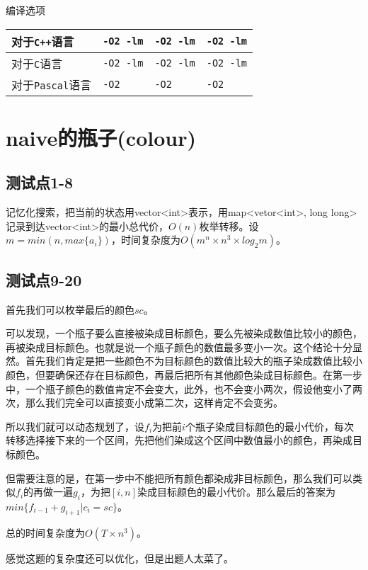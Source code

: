 \documentclass{ctexart}
\begin{document}
编译选项
\begin{table}[hb]
	\begin{center}
		\begin{tabular}{|p{3.37cm}|p{3.37cm}|p{3.37cm}|p{3.37cm}|}
			\hline
			对于\texttt{C++}语言 & \texttt{-O2 -lm} & \texttt{-O2 -lm} & \texttt{-O2 -lm} \\
			\hline
			对于\texttt{C}语言 & \texttt{-O2 -lm} & \texttt{-O2 -lm} & \texttt{-O2 -lm} \\
			\hline
			对于\texttt{Pascal}语言 & \texttt{-O2}    & \texttt{-O2}    & \texttt{-O2}     \\
			\hline
		\end{tabular}
	\end{center}
\end{table}



\newpage

\section{naive的瓶子(colour)}

\subsection{测试点1-8}

记忆化搜索，把当前的状态用vector<int>表示，用map<vetor<int>, long long>记录到达vector<int>的最小总代价，$O(n)$枚举转移。设$m = min(n, max\{a_i\})$，时间复杂度为$O(m^n \times n^3 \times log_2{m})$。 \par

\subsection{测试点9-20}

首先我们可以枚举最后的颜色$sc$。\par
可以发现，一个瓶子要么直接被染成目标颜色，要么先被染成数值比较小的颜色，再被染成目标颜色。也就是说一个瓶子颜色的数值最多变小一次。这个结论十分显然。首先我们肯定是把一些颜色不为目标颜色的数值比较大的瓶子染成数值比较小颜色，但要确保还存在目标颜色，再最后把所有其他颜色染成目标颜色。在第一步中，一个瓶子颜色的数值肯定不会变大，此外，也不会变小两次，假设他变小了两次，那么我们完全可以直接变小成第二次，这样肯定不会变劣。 \par
所以我们就可以动态规划了，设$f_i$为把前$i$个瓶子染成目标颜色的最小代价，每次转移选择接下来的一个区间，先把他们染成这个区间中数值最小的颜色，再染成目标颜色。 \par
但需要注意的是，在第一步中不能把所有颜色都染成非目标颜色，那么我们可以类似$f_i$的再做一遍$g_i$，为把$[i, n]$染成目标颜色的最小代价。那么最后的答案为$min\{f_{i - 1} + g_{i + 1} | c_i = sc\}$。 \par
总的时间复杂度为$O(T \times n^3)$。 \par
感觉这题的复杂度还可以优化，但是出题人太菜了。 \par
\end{document}
